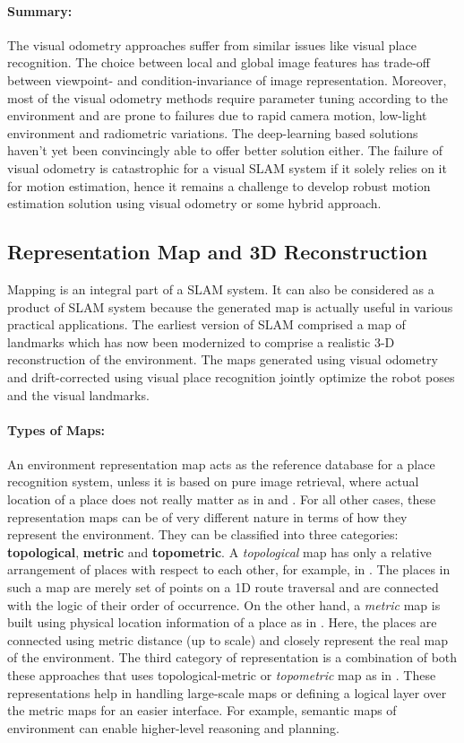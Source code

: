 \documentclass{article}
\begin{document}
\paragraph{Summary:}
The visual odometry approaches suffer from similar issues like visual place recognition. The choice between local and global image features has trade-off between viewpoint- and condition-invariance of image representation. Moreover, most of the visual odometry methods require parameter tuning according to the environment and are prone to failures due to rapid camera motion, low-light environment and radiometric variations. The deep-learning based solutions haven't yet been convincingly able to offer better solution either. The failure of visual odometry is catastrophic for a visual SLAM system if it solely relies on it for motion estimation, hence it remains a challenge to develop robust motion estimation solution using visual odometry or some hybrid approach.

\subsection{Representation Map and 3D Reconstruction}
Mapping is an integral part of a SLAM system. It can also be considered as a product of SLAM system because the generated map is actually useful in various practical applications. The earliest version of SLAM comprised a map of landmarks which has now been modernized to comprise a realistic 3-D reconstruction of the environment. The maps generated using visual odometry and drift-corrected using visual place recognition jointly optimize the robot poses and the visual landmarks. 

\paragraph{Types of Maps:}
An environment representation map acts as the reference database for a place recognition system, unless it is based on pure image retrieval, where actual location of a place does not really matter as in \cite{Cummins2010} and \cite{Nister2006}. For all other cases, these representation maps can be of very different nature in terms of how they represent the environment. They can be classified into three categories: \textbf{topological}, \textbf{metric} and \textbf{topometric}. A \emph{topological} map has only a relative arrangement of places with respect to each other, for example, in \cite{Lui2012, Milford2012}. The places in such a map are merely set of points on a 1D route traversal and are connected with the logic of their order of occurrence. On the other hand, a \emph{metric} map is built using physical location information of a place as in \cite{Gutmann2008, Klein2007}. Here, the places are connected using metric distance (up to scale) and closely represent the real map of the environment. The third category of representation is a combination of both these approaches that uses topological-metric or \emph{topometric} map as in \cite{Angeli2009, Bazeille2011, Konolige2011}. These representations help in handling large-scale maps or defining a logical layer over the metric maps for an easier interface. For example, semantic maps of environment \cite{sunderhauf2016place,flint2010growing} can enable higher-level reasoning and planning.
\end{document}
